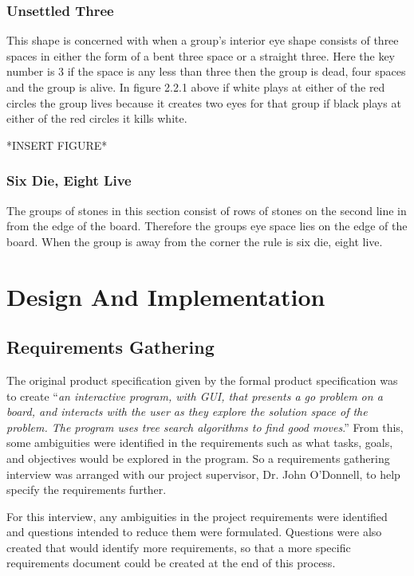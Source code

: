 \documentclass{l3proj}
\begin{document}
\subsection{Unsettled Three}

This shape is concerned with when a group’s interior eye shape consists of three spaces in either the form of a bent three space or a straight three. Here the key number is 3 if the space is any less than three then the group is dead,  four spaces and the group is alive. In figure 2.2.1 above if white plays at either of the red circles the group lives because it creates two eyes for that group if black plays at either of the red circles it kills white.

*INSERT FIGURE*

\subsection{Six Die, Eight Live}

The groups of stones in this section consist of rows of stones on the second line in from the edge of the board. Therefore the groups eye space lies on the edge of the board. When the group is away from the corner the rule is six die, eight live.

\chapter{Design And Implementation}
\label{design}

\section{Requirements Gathering}

The original product specification given by the formal product specification was to create “\textit{an interactive program, with GUI, that presents a go problem on a board, and interacts with the user as they explore the solution space of the problem. The program uses tree search algorithms to find good moves}.”  From this, some ambiguities were identified in the requirements such as what tasks, goals, and objectives would be explored in the program. So a requirements gathering interview was arranged with our project supervisor, Dr. John O’Donnell, to help specify the requirements further.

For this interview, any ambiguities in the project requirements were identified and questions intended to reduce them were formulated.  Questions were also created that would identify more requirements, so that a more specific requirements document could be created at the end of this process.
\end{document}
